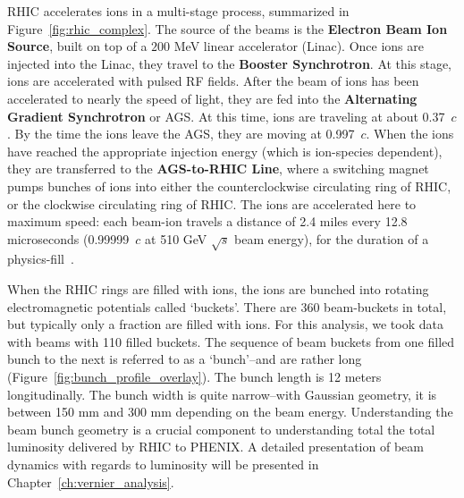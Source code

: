 RHIC accelerates ions in a multi-stage process, summarized in
Figure~\ref{fig:rhic_complex}. The source of the beams is the \textbf{Electron
Beam Ion Source}, built on top of a $200$ MeV linear accelerator (Linac). Once
ions are injected into the Linac, they travel to the \textbf{Booster
Synchrotron}.  At this stage, ions are accelerated with pulsed RF fields. After
the beam of ions has been accelerated to nearly the speed of light, they are fed
into the \textbf{Alternating Gradient Synchrotron} or AGS. At this time, ions
are traveling at about 0.37~$c$. By the time the ions leave the AGS, they are
moving at 0.997~$c$. When the ions have reached the appropriate injection energy
(which is ion-species dependent), they are transferred to the
\textbf{AGS-to-RHIC Line}, where a switching magnet pumps bunches of ions into
either the counterclockwise circulating ring of RHIC, or the clockwise
circulating ring of RHIC. The ions are accelerated here to maximum speed: each
beam-ion travels a distance of 2.4 miles every 12.8 microseconds (0.99999~$c$ at
510 GeV $\sqrt{s}$ beam energy), for the duration of a
physics-fill~\cite{RHIC2016}.

When the RHIC rings are filled with ions, the ions are bunched into rotating
electromagnetic potentials called `buckets'. There are 360 beam-buckets in
total, but typically only a fraction are filled with ions. For this analysis, we
took data with beams with 110 filled buckets. The sequence of beam buckets from
one filled bunch to the next is referred to as a `bunch'--and are rather long
(Figure~\ref{fig:bunch_profile_overlay}). The bunch length is 12 meters
longitudinally. The bunch width is quite narrow--with Gaussian geometry, it is
between 150 mm and 300 mm depending on the beam energy.  Understanding the beam
bunch geometry is a crucial component to understanding total the total
luminosity delivered by RHIC to PHENIX. A detailed presentation of beam dynamics
with regards to luminosity will be presented in
Chapter~\ref{ch:vernier_analysis}. 

